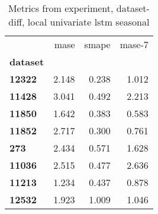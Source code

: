\begin{table}[h]
\centering
\caption{Metrics from experiment, dataset-diff, local univariate lstm seasonal}
\label{table:local-univariate-lstm-seasonal-dataset-diff}
\begin{tabular}{lrrr}
\toprule
{} &   mase &  smape &  mase-7 \\
\textbf{dataset} &        &        &         \\
\midrule
\textbf{12322  } &  2.148 &  0.238 &   1.012 \\
\textbf{11428  } &  3.041 &  0.492 &   2.213 \\
\textbf{11850  } &  1.642 &  0.383 &   0.583 \\
\textbf{11852  } &  2.717 &  0.300 &   0.761 \\
\textbf{273    } &  2.434 &  0.571 &   1.628 \\
\textbf{11036  } &  2.515 &  0.477 &   2.636 \\
\textbf{11213  } &  1.234 &  0.437 &   0.878 \\
\textbf{12532  } &  1.923 &  1.009 &   1.046 \\
\bottomrule
\end{tabular}
\end{table}
